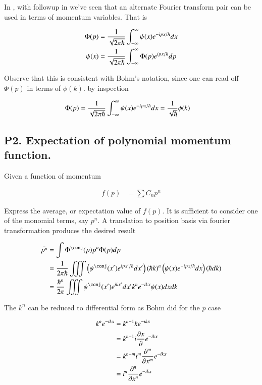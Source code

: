 \documentclass{article}
\newcommand{\PDN}[3]{\frac{\partial^{#3} {#2}}{\partial {#1}^{#3}}}
\newcommand{\IIinf}[0]{ \int_{-\infty}^\infty }
\newcommand{\FM}[0]{\inv{\sqrt{2\pi\hbar}}}
\begin{document}
In \cite{mcmahon2005qmd}, with followup in \cite{PJqmFourier} we've seen that an alternate Fourier transform pair can be used in terms of
momentum variables.  That is

\begin{align*}
\Phi(p) &= \FM \IIinf \psi(x) e^{-ipx/\hbar} dx \\
\psi(x) &= \FM \IIinf \Phi(p) e^{ipx/\hbar} dp \\
\end{align*}

Observe that this is consistent with Bohm's notation, since one can read off 
$\Phi(p)$ in terms of $\phi(k)$.
by inspection

\begin{align*}
\Phi(p) &= \FM \IIinf \psi(x) e^{-ipx/\hbar} dx = \inv{\sqrt{\hbar}} \phi(k)
\end{align*}

\subsection{ P2. Expectation of polynomial momentum function. }

Given a function of momentum 

\begin{align*}
f(p) &= \sum C_n p^n
\end{align*}

Express the average, or expectation value of $f(p)$.  It is sufficient to consider one of the monomial terms, say $p^n$.  A translation 
to position basis via fourier transformation produces the desired result

\begin{align*}
\bar{p^n} 
&= \int \Phi^\conj(p) p^n \Phi(p) dp \\
&= \inv{2\pi \hbar} \iiint \left( \psi^\conj(x') e^{ipx'/\hbar} dx' \right) (\hbar k)^n \left( \psi(x) e^{-ipx/\hbar} dx \right) (\hbar dk) \\
&= \frac{\hbar^n}{2\pi } \iiint \psi^\conj(x') e^{ikx'} dx' k^n e^{-i k x} \psi(x) dx dk \\
\end{align*}

The $k^n$ can be reduced to differential form as Bohm did for the $\bar{p}$ case

\begin{align*}
k^n e^{-i k x} 
&= k^{n-1} k e^{-i k x} \\
&= k^{n-1} i \PD{x}{}e^{-i k x} \\
&= k^{n-m} i^m \PDN{x}{}{m}e^{-i k x} \\
&= i^n \PDN{x}{}{n}e^{-i k x} \\
\end{align*}
\end{document}
